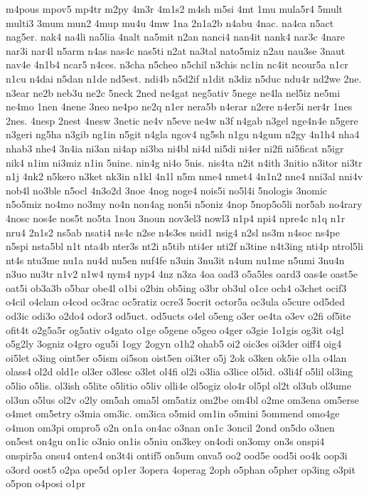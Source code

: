 {m4pous
mpov5
mp4tr
m2py
4m3r
4m1s2
m4sh
m5si
4mt
1mu
mula5r4
5mult
multi3
3mum
mun2
4mup
mu4u
4mw
1na
2n1a2b
n4abu
4nac.
na4ca
n5act
nag5er.
nak4
na4li
na5lia
4nalt
na5mit
n2an
nanci4
nan4it
nank4
nar3c
4nare
nar3i
nar4l
n5arm
n4as
nas4c
nas5ti
n2at
na3tal
nato5miz
n2au
nau3se
3naut
nav4e
4n1b4
ncar5
n4ces.
n3cha
n5cheo
n5chil
n3chis
nc1in
nc4it
ncour5a
n1cr
n1cu
n4dai
n5dan
n1de
nd5est.
ndi4b
n5d2if
n1dit
n3diz
n5duc
ndu4r
nd2we
2ne.
n3ear
ne2b
neb3u
ne2c
5neck
2ned
ne4gat
neg5ativ
5nege
ne4la
nel5iz
ne5mi
ne4mo
1nen
4nene
3neo
ne4po
ne2q
n1er
nera5b
n4erar
n2ere
n4er5i
ner4r
1nes
2nes.
4nesp
2nest
4nesw
3netic
ne4v
n5eve
ne4w
n3f
n4gab
n3gel
nge4n4e
n5gere
n3geri
ng5ha
n3gib
ng1in
n5git
n4gla
ngov4
ng5sh
n1gu
n4gum
n2gy
4n1h4
nha4
nhab3
nhe4
3n4ia
ni3an
ni4ap
ni3ba
ni4bl
ni4d
ni5di
ni4er
ni2fi
ni5ficat
n5igr
nik4
n1im
ni3miz
n1in
5nine.
nin4g
ni4o
5nis.
nis4ta
n2it
n4ith
3nitio
n3itor
ni3tr
n1j
4nk2
n5kero
n3ket
nk3in
n1kl
4n1l
n5m
nme4
nmet4
4n1n2
nne4
nni3al
nni4v
nob4l
no3ble
n5ocl
4n3o2d
3noe
4nog
noge4
nois5i
no5l4i
5nologis
3nomic
n5o5miz
no4mo
no3my
no4n
non4ag
non5i
n5oniz
4nop
5nop5o5li
nor5ab
no4rary
4nosc
nos4e
nos5t
no5ta
1nou
3noun
nov3el3
nowl3
n1p4
npi4
npre4c
n1q
n1r
nru4
2n1s2
ns5ab
nsati4
ns4c
n2se
n4s3es
nsid1
nsig4
n2sl
ns3m
n4soc
ns4pe
n5spi
nsta5bl
n1t
nta4b
nter3s
nt2i
n5tib
nti4er
nti2f
n3tine
n4t3ing
nti4p
ntrol5li
nt4s
ntu3me
nu1a
nu4d
nu5en
nuf4fe
n3uin
3nu3it
n4um
nu1me
n5umi
3nu4n
n3uo
nu3tr
n1v2
n1w4
nym4
nyp4
4nz
n3za
4oa
oad3
o5a5les
oard3
oas4e
oast5e
oat5i
ob3a3b
o5bar
obe4l
o1bi
o2bin
ob5ing
o3br
ob3ul
o1ce
och4
o3chet
ocif3
o4cil
o4clam
o4cod
oc3rac
oc5ratiz
ocre3
5ocrit
octor5a
oc3ula
o5cure
od5ded
od3ic
odi3o
o2do4
odor3
od5uct.
od5ucts
o4el
o5eng
o3er
oe4ta
o3ev
o2fi
of5ite
ofit4t
o2g5a5r
og5ativ
o4gato
o1ge
o5gene
o5geo
o4ger
o3gie
1o1gis
og3it
o4gl
o5g2ly
3ogniz
o4gro
ogu5i
1ogy
2ogyn
o1h2
ohab5
oi2
oic3es
oi3der
oiff4
oig4
oi5let
o3ing
oint5er
o5ism
oi5son
oist5en
oi3ter
o5j
2ok
o3ken
ok5ie
o1la
o4lan
olass4
ol2d
old1e
ol3er
o3lesc
o3let
ol4fi
ol2i
o3lia
o3lice
ol5id.
o3li4f
o5lil
ol3ing
o5lio
o5lis.
ol3ish
o5lite
o5litio
o5liv
olli4e
ol5ogiz
olo4r
ol5pl
ol2t
ol3ub
ol3ume
ol3un
o5lus
ol2v
o2ly
om5ah
oma5l
om5atiz
om2be
om4bl
o2me
om3ena
om5erse
o4met
om5etry
o3mia
om3ic.
om3ica
o5mid
om1in
o5mini
5ommend
omo4ge
o4mon
om3pi
ompro5
o2n
on1a
on4ac
o3nan
on1c
3oncil
2ond
on5do
o3nen
on5est
on4gu
on1ic
o3nio
on1is
o5niu
on3key
on4odi
on3omy
on3s
onspi4
onspir5a
onsu4
onten4
on3t4i
ontif5
on5um
onva5
oo2
ood5e
ood5i
oo4k
oop3i
o3ord
oost5
o2pa
ope5d
op1er
3opera
4operag
2oph
o5phan
o5pher
op3ing
o3pit
o5pon
o4posi
o1pr
}
